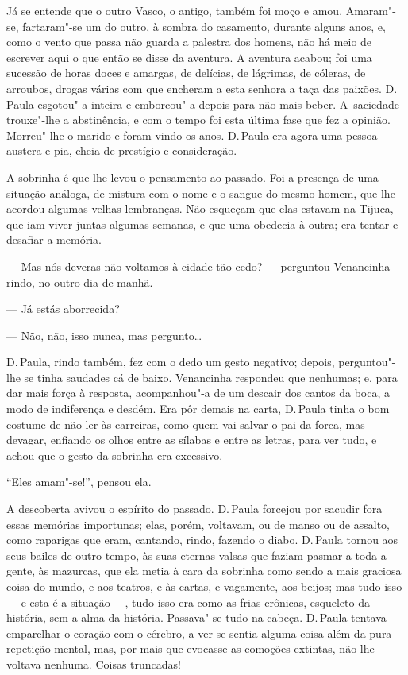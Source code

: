 \begin{linenumbers}
Já se entende que o outro Vasco, o antigo, também foi moço e amou.
Amaram"-se, fartaram"-se um do outro, à sombra do casamento, durante
alguns anos, e, como o vento que passa não guarda a palestra dos homens,
não há meio de escrever aqui o que então se disse da aventura. A
aventura acabou; foi uma sucessão de horas doces e amargas, de delícias,
de lágrimas, de cóleras, de arroubos, drogas várias com que encheram a
esta senhora a taça das paixões. D.\,Paula esgotou"-a inteira e emborcou"-a
depois para não mais beber. A~saciedade trouxe"-lhe a abstinência, e com
o tempo foi esta última fase que fez a opinião. Morreu"-lhe o marido e
foram vindo os anos. D.\,Paula era agora uma pessoa austera e pia, cheia
de prestígio e consideração.

A sobrinha é que lhe levou o pensamento ao passado. Foi a presença de
uma situação análoga, de mistura com o nome e o sangue do mesmo homem,
que lhe acordou algumas velhas lembranças. Não esqueçam que elas estavam
na Tijuca, que iam viver juntas algumas semanas, e que uma obedecia à
outra; era tentar e desafiar a memória.

--- Mas nós deveras não voltamos à cidade tão cedo? --- perguntou
Venancinha rindo, no outro dia de manhã.

--- Já estás aborrecida?

--- Não, não, isso nunca, mas pergunto\ldots{}

D.\,Paula, rindo também, fez com o dedo um gesto negativo; depois,
perguntou"-lhe se tinha saudades cá de baixo. Venancinha respondeu que
nenhumas; e, para dar mais força à resposta, acompanhou"-a de um descair
dos cantos da boca, a modo de indiferença e desdém. Era pôr demais na
carta, D.\,Paula tinha o bom costume de não ler às carreiras, como quem
vai salvar o pai da forca, mas devagar, enfiando os olhos entre as
sílabas e entre as letras, para ver tudo, e achou que o gesto da
sobrinha era excessivo.

``Eles amam"-se!'', pensou ela.

A descoberta avivou o espírito do passado. D.\,Paula forcejou por sacudir
fora essas memórias importunas; elas, porém, voltavam, ou de manso ou de
assalto, como raparigas que eram, cantando, rindo, fazendo o diabo. D.\,Paula tornou aos seus bailes de outro tempo, às suas eternas valsas que
faziam pasmar a toda a gente, às mazurcas, que ela metia à cara da
sobrinha como sendo a mais graciosa coisa do mundo, e aos teatros, e às
cartas, e vagamente, aos beijos; mas tudo isso --- e esta é a situação
---, tudo isso era como as frias crônicas, esqueleto da história, sem a
alma da história. Passava"-se tudo na cabeça. D.\,Paula tentava emparelhar
o coração com o cérebro, a ver se sentia alguma coisa além da pura
repetição mental, mas, por mais que evocasse as comoções extintas, não
lhe voltava nenhuma. Coisas truncadas!


\end{linenumbers}
